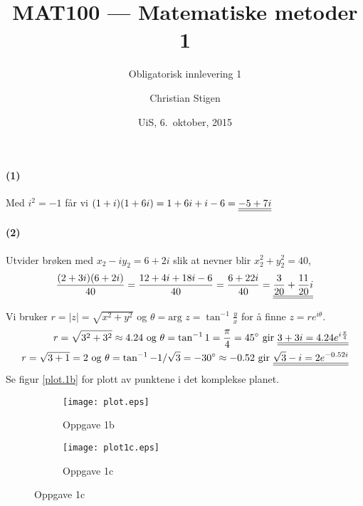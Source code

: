 \documentclass[a4paper,norsk,12pt]{article}
\title{MAT100 --- Matematiske metoder 1}
\subtitle{Obligatorisk innlevering 1}
\author{Christian Stigen}
\date{UiS, 6.~oktober, 2015}
\begin{document}
\maketitle


\paragraph{(1)}
Med $i^2 = -1$ får vi
\begin{math}
  (1+i)(1+6i) = 1+6i+i-6 = {\underline{\underline{-5+7i}}}
\end{math}

\paragraph{(2)}
Utvider brøken med $x_2 - iy_2 = 6 + 2i$ slik at nevner blir $x_2^2 +
y_2^2 = 40$,
\begin{equation*}
  \frac{(2+3i)(6+2i)}{40} = \frac{12+4i+18i-6}{40}
  = \frac{6+22i}{40} = {\underline{\underline{\frac{3}{20} + \frac{11}{20}i}}}
\end{equation*}


Vi bruker $r = |z| = \sqrt{x^2+y^2}$ og $\theta = \text{arg } z =
\tan^{-1}\frac{y}{x}$ for å finne $z = re^{i\theta}$.
\begin{equation*}
\begin{split}
  r = \sqrt{3^2+3^2} \approx 4.24 \text{ og } \theta = \tan^{-1}{1} =
  \frac{\pi}{4} = 45^\circ \text{ gir } {\underline{\underline{3+3i = 4.24 e^{i\frac{\pi}{4}}}}}
  \\
  r=\sqrt{3+1}=2 \text{ og } \theta = \tan^{-1}{-1/\sqrt{3}} = -30^\circ \approx -0.52
  \text{ gir }
  {\underline{\underline{\sqrt{3}-i = 2e^{-0.52i}}}}
\end{split}
\end{equation*}
%
Se figur \vref{plot.1b} for plott av punktene i det komplekse planet.

\begin{figure}[h]
  \begin{subfigure}[b]{0.5\textwidth}
  \texttt{[image: plot.eps]}
  \caption{Oppgave 1b}
  \label{plot.1b}
  \end{subfigure}
  \begin{subfigure}[b]{0.5\textwidth}
  \texttt{[image: plot1c.eps]}
  \caption{Oppgave 1c}
  \label{plot.1c}
  \end{subfigure}
\end{figure}
\end{document}
